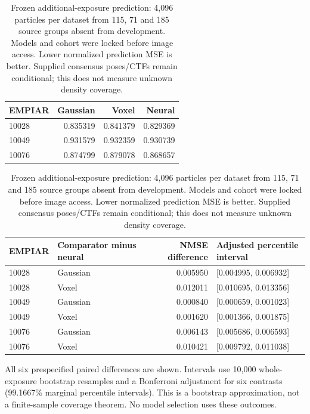 \begin{table}[t]
\centering
\caption{Frozen additional-exposure prediction: 4,096 particles per dataset from 115, 71 and 185 source groups absent from development. Models and cohort were locked before image access. Lower normalized prediction MSE is better. Supplied consensus poses/CTFs remain conditional; this does not measure unknown density coverage.}
\label{tab:freshprediction}
\begin{tabular}{lrrr}\toprule
EMPIAR & Gaussian & Voxel & Neural \\\midrule
10028 & 0.835319 & 0.841379 & 0.829369 \\
10049 & 0.931579 & 0.932359 & 0.930739 \\
10076 & 0.874799 & 0.879078 & 0.868657 \\
\bottomrule\end{tabular}
\medskip

\begin{tabular}{llrl}\toprule
EMPIAR & Comparator minus neural & NMSE difference & Adjusted percentile interval \\\midrule
10028 & Gaussian & 0.005950 & [0.004995, 0.006932] \\
10028 & Voxel & 0.012011 & [0.010695, 0.013356] \\
10049 & Gaussian & 0.000840 & [0.000659, 0.001023] \\
10049 & Voxel & 0.001620 & [0.001366, 0.001875] \\
10076 & Gaussian & 0.006143 & [0.005686, 0.006593] \\
10076 & Voxel & 0.010421 & [0.009792, 0.011038] \\
\bottomrule\end{tabular}
\par\small{All six prespecified paired differences are shown. Intervals use 10,000 whole-exposure bootstrap resamples and a Bonferroni adjustment for six contrasts (99.1667\% marginal percentile intervals). This is a bootstrap approximation, not a finite-sample coverage theorem. No model selection uses these outcomes.}
\end{table}
